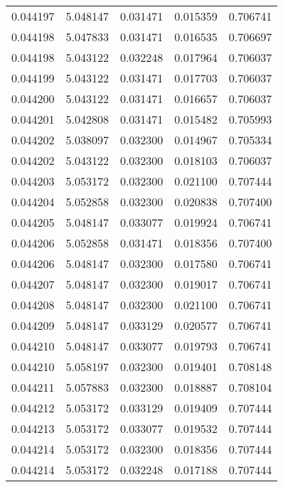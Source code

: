 \begin{tabular}{lrrrr}
0.044197    &  5.048147 &  0.031471 &  0.015359 &             0.706741 \\
0.044198    &  5.047833 &  0.031471 &  0.016535 &             0.706697 \\
0.044198    &  5.043122 &  0.032248 &  0.017964 &             0.706037 \\
0.044199    &  5.043122 &  0.031471 &  0.017703 &             0.706037 \\
0.044200    &  5.043122 &  0.031471 &  0.016657 &             0.706037 \\
0.044201    &  5.042808 &  0.031471 &  0.015482 &             0.705993 \\
0.044202    &  5.038097 &  0.032300 &  0.014967 &             0.705334 \\
0.044202    &  5.043122 &  0.032300 &  0.018103 &             0.706037 \\
0.044203    &  5.053172 &  0.032300 &  0.021100 &             0.707444 \\
0.044204    &  5.052858 &  0.032300 &  0.020838 &             0.707400 \\
0.044205    &  5.048147 &  0.033077 &  0.019924 &             0.706741 \\
0.044206    &  5.052858 &  0.031471 &  0.018356 &             0.707400 \\
0.044206    &  5.048147 &  0.032300 &  0.017580 &             0.706741 \\
0.044207    &  5.048147 &  0.032300 &  0.019017 &             0.706741 \\
0.044208    &  5.048147 &  0.032300 &  0.021100 &             0.706741 \\
0.044209    &  5.048147 &  0.033129 &  0.020577 &             0.706741 \\
0.044210    &  5.048147 &  0.033077 &  0.019793 &             0.706741 \\
0.044210    &  5.058197 &  0.032300 &  0.019401 &             0.708148 \\
0.044211    &  5.057883 &  0.032300 &  0.018887 &             0.708104 \\
0.044212    &  5.053172 &  0.033129 &  0.019409 &             0.707444 \\
0.044213    &  5.053172 &  0.033077 &  0.019532 &             0.707444 \\
0.044214    &  5.053172 &  0.032300 &  0.018356 &             0.707444 \\
0.044214    &  5.053172 &  0.032248 &  0.017188 &             0.707444 \\

\end{tabular}
